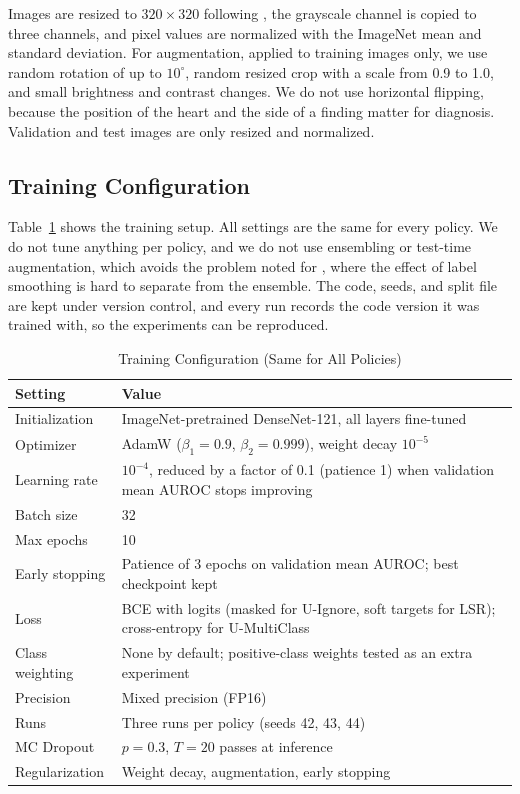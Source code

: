\documentclass[conference]{IEEEtran}
\begin{document}
Images are resized to $320 \times 320$ following \cite{ref1}, the grayscale channel is copied to three channels, and pixel values are normalized with the ImageNet mean and standard deviation. For augmentation, applied to training images only, we use random rotation of up to $10^{\circ}$, random resized crop with a scale from 0.9 to 1.0, and small brightness and contrast changes. We do not use horizontal flipping, because the position of the heart and the side of a finding matter for diagnosis. Validation and test images are only resized and normalized.

\subsection{Training Configuration}

Table~\ref{tab:training} shows the training setup. All settings are the same for every policy. We do not tune anything per policy, and we do not use ensembling or test-time augmentation, which avoids the problem noted for \cite{ref5}, where the effect of label smoothing is hard to separate from the ensemble. The code, seeds, and split file are kept under version control, and every run records the code version it was trained with, so the experiments can be reproduced.

\begin{table}[!t]
\centering
\caption{Training Configuration (Same for All Policies)}
\label{tab:training}
\small
\begin{tabular}{@{}p{2.3cm}p{5.2cm}@{}}
\toprule
\textbf{Setting} & \textbf{Value} \\
\midrule
Initialization & ImageNet-pretrained DenseNet-121, all layers fine-tuned \\
Optimizer & AdamW ($\beta_1 = 0.9$, $\beta_2 = 0.999$), weight decay $10^{-5}$ \\
Learning rate & $10^{-4}$, reduced by a factor of 0.1 (patience 1) when validation mean AUROC stops improving \\
Batch size & 32 \\
Max epochs & 10 \\
Early stopping & Patience of 3 epochs on validation mean AUROC; best checkpoint kept \\
Loss & BCE with logits (masked for U-Ignore, soft targets for LSR); cross-entropy for U-MultiClass \\
Class weighting & None by default; positive-class weights tested as an extra experiment \\
Precision & Mixed precision (FP16) \\
Runs & Three runs per policy (seeds 42, 43, 44) \\
MC Dropout & $p = 0.3$, $T = 20$ passes at inference \\
Regularization & Weight decay, augmentation, early stopping \\
\bottomrule
\end{tabular}
\end{table}
\end{document}
